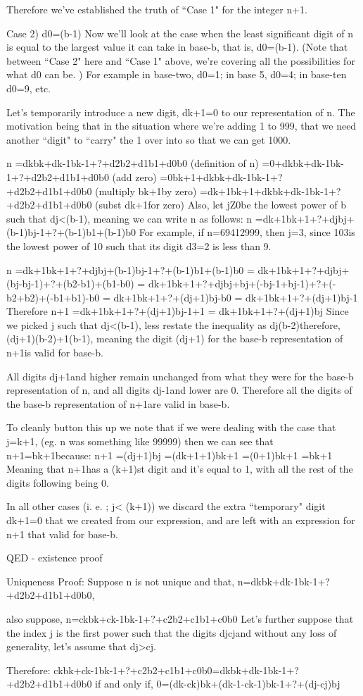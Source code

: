 \documentclass{article}
\begin{document}
Therefore we’ve established the truth of ``Case 1" for the integer n+1.

Case 2) d0=(b-1) 
Now we’ll look at the case when the least significant digit of n is equal to the largest value it can take in base-b,
that is,
d0=(b-1).
(Note that between ``Case 2" here and ``Case 1" above,
we’re covering all the possibilities for what d0 can be.
)
For example in base-two,
d0=1; in base 5,
d0=4; in base-ten d0=9,
etc.

Let’s temporarily introduce a new digit,
dk+1=0 to our representation of n.
The motivation being that in the situation where we’re adding 1 to 999,
that we need another ``digit" to ``carry" the 1 over into so that we can get 1000.

n =dkbk+dk-1bk-1+?+d2b2+d1b1+d0b0 (definition of n)
=0+dkbk+dk-1bk-1+?+d2b2+d1b1+d0b0 (add zero)
=0bk+1+dkbk+dk-1bk-1+?+d2b2+d1b1+d0b0 (multiply bk+1by zero)
=dk+1bk+1+dkbk+dk-1bk-1+?+d2b2+d1b1+d0b0 (subst dk+1for zero)
Also,
let jZ0be the lowest power of b such that dj<(b-1),
meaning we can write n as follows:
n =dk+1bk+1+?+djbj+(b-1)bj-1+?+(b-1)b1+(b-1)b0
For example,
if n=69412999,
then j=3,
since 103is the lowest power of 10 such that its digit d3=2 is less than 9.

n =dk+1bk+1+?+djbj+(b-1)bj-1+?+(b-1)b1+(b-1)b0
= dk+1bk+1+?+djbj+(bj-bj-1)+?+(b2-b1)+(b1-b0)
= dk+1bk+1+?+djbj+bj+(-bj-1+bj-1)+?+(-b2+b2)+(-b1+b1)-b0
= dk+1bk+1+?+(dj+1)bj-b0
= dk+1bk+1+?+(dj+1)bj-1
Therefore
n+1 =dk+1bk+1+?+(dj+1)bj-1+1
= dk+1bk+1+?+(dj+1)bj
Since we picked j such that dj<(b-1),
less restate the inequality as dj(b-2)therefore,
(dj+1)(b-2)+1(b-1),
meaning the digit (dj+1) for the base-b representation of n+1is valid for base-b.

All digits dj+1and higher remain unchanged from what they were for the base-b representation of n,
and all digits dj-1and lower are 0.
Therefore all the digits of the base-b representation of n+1are valid in base-b.

To cleanly button this up we note that if we were dealing with the case that j=k+1,
(eg.
n was something like 99999) then we can see that n+1=bk+1because:
n+1 =(dj+1)bj
=(dk+1+1)bk+1
=(0+1)bk+1
=bk+1
Meaning that n+1has a (k+1)st digit and it’s equal to 1,
with all the rest of the digits following being 0.

In all other cases (i.
e.
; j< (k+1)) we discard the extra ``temporary" digit dk+1=0 that we created from our expression,
and are left with an expression for n+1 that valid for base-b.

QED - existence proof

Uniqueness Proof:
Suppose n is not unique and that,
n=dkbk+dk-1bk-1+?+d2b2+d1b1+d0b0,

also suppose,
n=ckbk+ck-1bk-1+?+c2b2+c1b1+c0b0
Let’s further suppose that the index j is the first power such that the digits djcjand without any loss of generality,
let’s assume that dj>cj.

Therefore:
ckbk+ck-1bk-1+?+c2b2+c1b1+c0b0=dkbk+dk-1bk-1+?+d2b2+d1b1+d0b0
if and only if,
0=(dk-ck)bk+(dk-1-ck-1)bk-1+?+(dj-cj)bj
\end{document}
